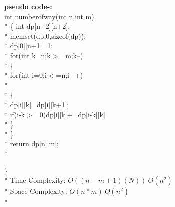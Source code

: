 \documentclass[12pt]{book}
\begin{document}
\textbf{pseudo code-:}\\
int numberofway(int n,int m)\\*
\{
\newline
\phantom{x} \hspace{3ex}int dp[n+2][n+2];\\*
\phantom{x} \hspace{3ex}memset(dp,0,sizeof(dp));\\*
\phantom{x} \hspace{3ex}dp[0][n+1]=1;\\*
\phantom{x} \hspace{3ex}for(int k=n;k$>$=m;k--)\\*
\phantom{x} \hspace{3ex}\{ \\*
\phantom{x} \hspace{3ex}\phantom{x} \hspace{3ex}for(int i=0;i$<$=n;i++)\\*\\*
\phantom{x} \hspace{3ex}\phantom{x} \hspace{3ex}\{ \\*
\phantom{x} \hspace{3ex}\phantom{x} \hspace{3ex}dp[i][k]=dp[i][k+1];\\*
\phantom{x} \hspace{3ex}\phantom{x} \hspace{3ex}if(i-k$>$=0)dp[i][k]+=dp[i-k][k]\\*
\phantom{x} \hspace{3ex}\phantom{x} \hspace{3ex}\} \\*
\phantom{x} \hspace{3ex}\} \\*
\phantom{x} \hspace{3ex}return dp[n][m];\\*

\} \\*
Time Complexity:
$O((n-m+1)(N)) ~ O(n^2)$ \\*
Space Complexity:
$O(n*m) ~ O(n^2)$ \\*
\newline
\newline
\end{document}
